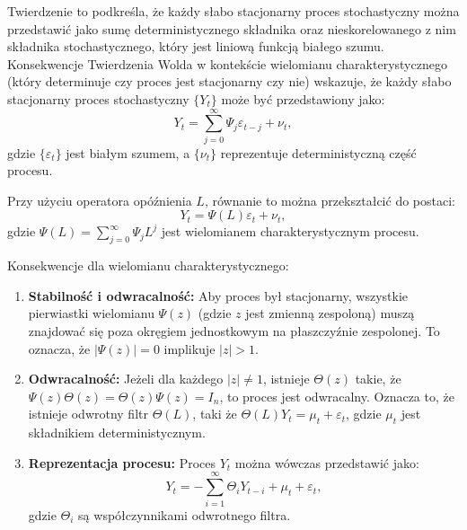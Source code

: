 \begin{enumerate}
Twierdzenie to podkreśla, że każdy słabo stacjonarny proces stochastyczny można przedstawić jako sumę deterministycznego składnika oraz nieskorelowanego z nim składnika stochastycznego, który jest liniową funkcją białego szumu. Konsekwencje Twierdzenia Wolda w kontekście wielomianu charakterystycznego (który determinuje czy proces jest stacjonarny czy nie) wskazuje, że każdy słabo stacjonarny proces stochastyczny \( \{Y_t\} \) może być przedstawiony jako:
\begin{equation}
Y_t = \sum_{j=0}^{\infty} \Psi_j \varepsilon_{t-j} + \nu_t,
\end{equation}
gdzie \( \{\varepsilon_t\} \) jest białym szumem, a \( \{\nu_t\} \) reprezentuje deterministyczną część procesu.

Przy użyciu operatora opóźnienia \( L \), równanie to można przekształcić do postaci:
\begin{equation}
Y_t = \Psi(L) \varepsilon_t + \nu_t,
\end{equation}
gdzie \( \Psi(L) = \sum_{j=0}^{\infty} \Psi_j L^j \) jest wielomianem charakterystycznym procesu.

Konsekwencje dla wielomianu charakterystycznego:
\begin{enumerate}
    \item \textbf{Stabilność i odwracalność:} Aby proces był stacjonarny, wszystkie pierwiastki wielomianu \( \Psi(z) \) (gdzie \( z \) jest zmienną zespoloną) muszą znajdować się poza okręgiem jednostkowym na płaszczyźnie zespolonej. To oznacza, że \( |\Psi(z)| = 0 \) implikuje \( |z| > 1 \).
    
    \item \textbf{Odwracalność:} Jeżeli dla każdego \( |z| \neq 1 \), istnieje \( \Theta(z) \) takie, że \( \Psi(z)\Theta(z) = \Theta(z)\Psi(z) = I_n \), to proces jest odwracalny. Oznacza to, że istnieje odwrotny filtr \( \Theta(L) \), taki że \( \Theta(L)Y_t = \mu_t + \varepsilon_t \), gdzie \( \mu_t \) jest składnikiem deterministycznym.
    
    \item \textbf{Reprezentacja procesu:} Proces \( Y_t \) można wówczas przedstawić jako:
    \begin{equation}
    Y_t = -\sum_{i=1}^{\infty} \Theta_i Y_{t-i} + \mu_t + \varepsilon_t,
    \end{equation}
    gdzie \( \Theta_i \) są współczynnikami odwrotnego filtra.
\end{enumerate}


\end{enumerate}
